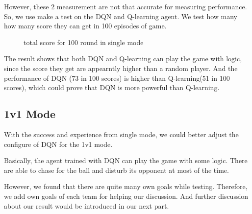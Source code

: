 \documentclass[12pt]{article}
\begin{document}
However, these 2 measurement are not that accurate for measuring performance. So, we use make a test on the DQN and Q-learning agent. We test how many how many score they can get in 100 episodes of game.

\begin{figure}[htbp]
	\centering
	\caption{total score for 100 round in single mode}
\end{figure}

 The result shows that both DQN and Q-learning can play the game with logic, since the score they get are appearntly higher than a random player. And the performance of DQN (73 in 100 scores) is higher than Q-learning(51 in 100 scores), which could prove that DQN is more powerful than Q-learning.


\subsection{1v1 Mode}

With the success and experience from single mode, we could better adjust the configure of DQN for the 1v1 mode.

Basically, the agent trained with DQN can play the game with some logic. There are able to chase for the ball and disturb its opponent at most of the time.

However, we found that there are quite many own goals while testing. Therefore, we add own goals of each team for helping our discussion. And further discussion about our result would be introduced in our next part.
\end{document}
